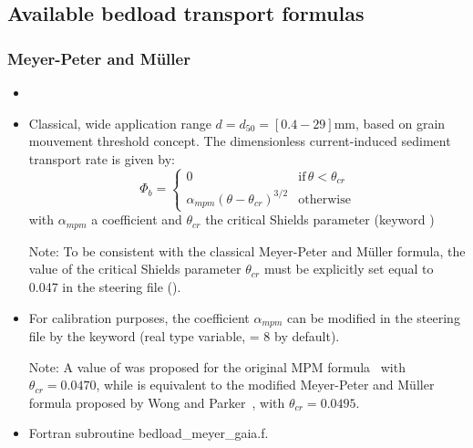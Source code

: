 \subsection{Available bedload transport formulas}
\subsubsection{Meyer-Peter and M\"uller}
\begin{itemize}
\item {}
\item Classical, wide application range $d=d_{50} = [0.4-29]$mm, based on grain mouvement threshold concept. The dimensionless current-induced sediment transport rate is given by:
\begin{equation*}
\Phi_b=\left\{\begin{array}{ll}
0 & \text{if}\,\theta<\theta_{cr}\\
\alpha_{mpm}(\theta-\theta_{cr})^{3/2} & \text{otherwise}
\end{array}
\right.
\end{equation*}
with $\alpha_{mpm}$ a coefficient and $\theta_{cr}$ the critical Shields parameter (keyword )

   \begin{WarningBlock}{Note:}
  To be consistent with the classical Meyer-Peter and M\"uller formula, the value of the critical Shields parameter $\theta_{cr}$ must be explicitly set equal to 0.047 in the steering file ().
\end{WarningBlock}

\item For calibration purposes, the coefficient $\alpha_{mpm}$ can be modified in the steering file by the keyword  (real type variable, {\ttfamily = 8} by default).

  \begin{WarningBlock}{Note:}
  A value of  was proposed for the original MPM formula~\cite{GarciaBook2006} with $\theta_{cr}=0.0470$, while  is equivalent to the modified Meyer-Peter and M\"uller formula proposed by Wong and Parker~\cite{WongParker06}, with $\theta_{cr}=0.0495$.
  \end{WarningBlock}



\item Fortran subroutine {\ttfamily bedload\_meyer\_gaia.f}.

\end{itemize}

